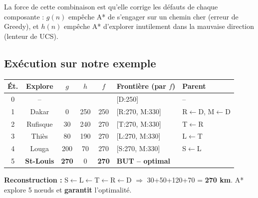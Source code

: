 \documentclass[11pt,a4paper]{article}
\begin{document}
La force de cette combinaison est qu'elle corrige les défauts de chaque composante : $g(n)$ empêche A* de s'engager sur un chemin cher (erreur de Greedy), et $h(n)$ empêche A* d'explorer inutilement dans la mauvaise direction (lenteur de UCS).

\subsection{Exécution sur notre exemple}

{\small
\begin{center}
\begin{tabular}{|c|c|c|c|c|l|l|}
\hline
\textbf{Ét.} & \textbf{Explore} & $g$ & $h$ & $f$ & \textbf{Frontière (par $f$)} & \textbf{Parent} \\
\hline
0 & -- & & & & [D:250] & -- \\
1 & Dakar & 0 & 250 & 250 & [R:270, M:330] & R$\leftarrow$D, M$\leftarrow$D \\
2 & Rufisque & 30 & 240 & 270 & [T:270, M:330] & T$\leftarrow$R \\
3 & Thiès & 80 & 190 & 270 & [L:270, M:330] & L$\leftarrow$T \\
4 & Louga & 200 & 70 & 270 & [S:270, M:330] & S$\leftarrow$L \\
5 & \textbf{St-Louis} & \textbf{270} & 0 & \textbf{270} & \textbf{BUT -- optimal} & \\
\hline
\end{tabular}
\end{center}
}

\textbf{Reconstruction :} S$\leftarrow$L$\leftarrow$T$\leftarrow$R$\leftarrow$D $\Rightarrow$ 30+50+120+70 = \textbf{270 km}. A* explore 5 nœuds et \textbf{garantit} l'optimalité.
\end{document}
